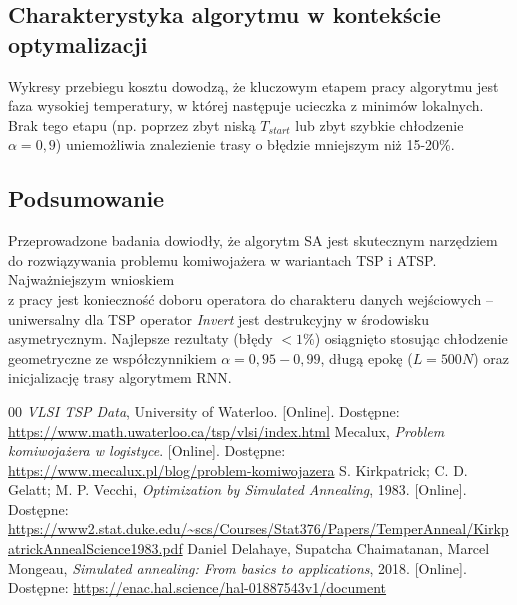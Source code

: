 \documentclass[conference]{IEEEtran}
\begin{document}
        \subsection{Charakterystyka algorytmu w kontekście optymalizacji}
            Wykresy przebiegu kosztu dowodzą, że kluczowym etapem pracy algorytmu jest faza wysokiej temperatury, w której następuje ucieczka z minimów lokalnych. Brak tego etapu (np. poprzez zbyt niską $T_{start}$ lub zbyt szybkie chłodzenie $\alpha=0,9$) uniemożliwia znalezienie trasy o błędzie mniejszym niż 15-20\%.
        \subsection{Podsumowanie}
            Przeprowadzone badania dowiodły, że algorytm SA jest skutecznym narzędziem do rozwiązywania problemu komiwojażera w wariantach TSP i ATSP. Najważniejszym wnioskiem \\ z pracy jest konieczność doboru operatora do charakteru danych wejściowych – uniwersalny dla TSP operator \textit{Invert} jest destrukcyjny w środowisku asymetrycznym. Najlepsze rezultaty (błędy $<1\%$) osiągnięto stosując chłodzenie geometryczne ze współczynnikiem $\alpha=0,95-0,99$, długą epokę ($L=500N$) oraz inicjalizację trasy algorytmem RNN.


    \begin{thebibliography}{00}
         \textit{VLSI TSP Data}, University of Waterloo. [Online]. Dostępne: \url{https://www.math.uwaterloo.ca/tsp/vlsi/index.html}
         Mecalux, \textit{Problem komiwojażera w logistyce}. [Online]. Dostępne: \url{https://www.mecalux.pl/blog/problem-komiwojazera}
         S. Kirkpatrick; C. D. Gelatt; M. P. Vecchi, \textit{Optimization by Simulated Annealing}, 1983. [Online]. Dostępne: \url{https://www2.stat.duke.edu/~scs/Courses/Stat376/Papers/TemperAnneal/KirkpatrickAnnealScience1983.pdf}
         Daniel Delahaye, Supatcha Chaimatanan, Marcel Mongeau, \textit{Simulated annealing: From basics to applications}, 2018. [Online]. Dostępne: \url{https://enac.hal.science/hal-01887543v1/document}
    \end{thebibliography}
\end{document}
